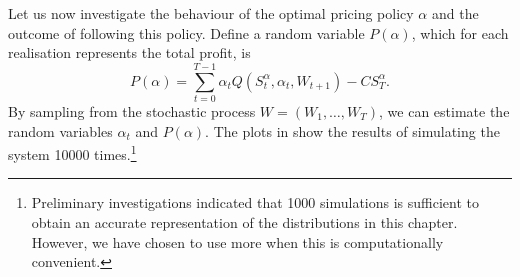 \documentclass[main.tex]{subfiles}
\begin{document}
Let us now investigate the behaviour of the optimal pricing policy
$\alpha$ and
the outcome of following this policy.
Define a random variable $P(\alpha)$, which for each realisation
represents the total profit, is
\begin{equation}
  P(\alpha) = \sum_{t=0}^{T-1}\alpha_tQ(S_t^\alpha,\alpha_t,W_{t+1}) - CS_T^\alpha.
\end{equation}
By sampling from the stochastic process $W=(W_1,\dots,W_T)$, we can
estimate the random variables $\alpha_t$ and $P(\alpha)$.
The plots in  show the results of
simulating the system \num{10000} times.\footnote{Preliminary
  investigations indicated that \num{1000}
  simulations is sufficient to obtain an accurate representation of
  the distributions in this chapter. However, we have chosen to use
  more when this is computationally convenient.
}
\end{document}
